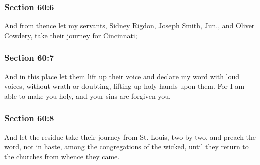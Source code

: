 	\subsubsection{Section 60:6} %
		\label{DC60-6}

		And from thence let my servants, Sidney Rigdon, Joseph Smith, Jun., and Oliver Cowdery, take their journey for Cincinnati;


	\subsubsection{Section 60:7} %
		\label{DC60-7}

		And in this place let them lift up their voice and declare my word with loud voices, without wrath or doubting, lifting up holy hands upon them.  For I am able to make you holy, and your sins are forgiven you.


	\subsubsection{Section 60:8} %
		\label{DC60-8}

		And let the residue take their journey from St. Louis, two by two, and preach the word, not in haste, among the congregations of the wicked, until they return to the churches from whence they came.


